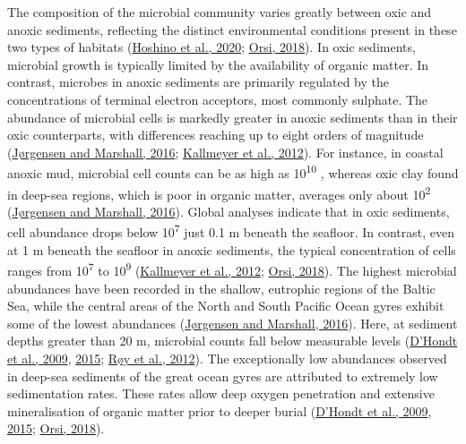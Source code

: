 \documentclass[
  12 pt,
]{book}
\begin{document}
The composition of the microbial community varies greatly between oxic and anoxic sediments, reflecting the distinct environmental conditions present in these two types of habitats (\protect\hyperlink{ref-Hoshino2020}{Hoshino et al., 2020}; \protect\hyperlink{ref-Orsi2018}{Orsi, 2018}). In oxic sediments, microbial growth is typically limited by the availability of organic matter. In contrast, microbes in anoxic sediments are primarily regulated by the concentrations of terminal electron acceptors, most commonly sulphate. The abundance of microbial cells is markedly greater in anoxic sediments than in their oxic counterparts, with differences reaching up to eight orders of magnitude (\protect\hyperlink{ref-Jorgensen2016}{Jørgensen and Marshall, 2016}; \protect\hyperlink{ref-Kallmeyer2012}{Kallmeyer et al., 2012}). For instance, in coastal anoxic mud, microbial cell counts can be as high as 10\textsuperscript{10} \si{\cellsPerCubiccm}, whereas oxic clay found in deep-sea regions, which is poor in organic matter, averages only about 10\textsuperscript{2} \si{\cellsPerCubiccm} (\protect\hyperlink{ref-Jorgensen2016}{Jørgensen and Marshall, 2016}). Global analyses indicate that in oxic sediments, cell abundance drops below 10\textsuperscript{7} \si{\cellsPerg} just 0.1 \si{\m} beneath the seafloor. In contrast, even at 1 \si{\m} beneath the seafloor in anoxic sediments, the typical concentration of cells ranges from 10\textsuperscript{7} to 10\textsuperscript{9} \si{\cellsPerg} (\protect\hyperlink{ref-Kallmeyer2012}{Kallmeyer et al., 2012}; \protect\hyperlink{ref-Orsi2018}{Orsi, 2018}). The highest microbial abundances have been recorded in the shallow, eutrophic regions of the Baltic Sea, while the central areas of the North and South Pacific Ocean gyres exhibit some of the lowest abundances (\protect\hyperlink{ref-Jorgensen2016}{Jørgensen and Marshall, 2016}). Here, at sediment depths greater than 20 \si{\m}, microbial counts fall below measurable levels (\protect\hyperlink{ref-DHondt2009}{D'Hondt et al., 2009}, \protect\hyperlink{ref-DHondt2015}{2015}; \protect\hyperlink{ref-Roy2012}{Røy et al., 2012}). The exceptionally low abundances observed in deep-sea sediments of the great ocean gyres are attributed to extremely low sedimentation rates. These rates allow deep oxygen penetration and extensive mineralisation of organic matter prior to deeper burial (\protect\hyperlink{ref-DHondt2009}{D'Hondt et al., 2009}, \protect\hyperlink{ref-DHondt2015}{2015}; \protect\hyperlink{ref-Orsi2018}{Orsi, 2018}).

\newpage
\end{document}
